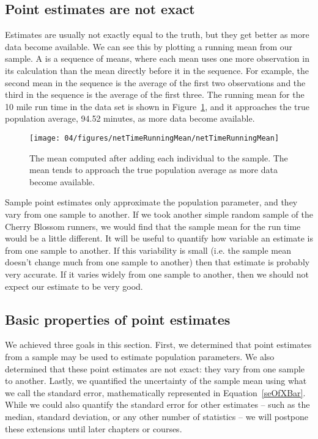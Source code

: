 \subsection{Point estimates are not exact}

Estimates are usually not exactly equal to the truth, but they get better as more data become available. We can see this by plotting a running mean from our  sample. A  is a sequence of means, where each mean uses one more observation in its calculation than the mean directly before it in the sequence. For example, the second mean in the sequence is the average of the first two observations and the third in the sequence is the average of the first three. The running mean for the 10 mile run time in the  data set is shown in Figure~\ref{netTimeRunningMean}, and it approaches the true population average, 94.52 minutes, as more data become available.

\begin{figure}
   \centering
   \texttt{[image: 04/figures/netTimeRunningMean/netTimeRunningMean]}
   \caption{The mean computed after adding each individual to the sample. The mean tends to approach the true population average as more data become available.}
   \label{netTimeRunningMean}
\end{figure}

Sample point estimates only approximate the population parameter, and they vary from one sample to another. If we took another simple random sample of the Cherry Blossom runners, we would find that the sample mean for the run time would be a little different. It will be useful to quantify how variable
an estimate is from one sample to another. If this variability is small (i.e. the sample mean doesn't change much from one sample to another) then that estimate is probably very accurate. If it varies widely from one sample to another, then we should not expect our estimate to be very good.


\subsection{Basic properties of point estimates}

We achieved three goals in this section. First, we determined that point estimates from a sample may be used to estimate population parameters. We also determined that these point estimates are not exact: they vary from one sample to another. Lastly, we quantified the uncertainty of the sample mean using what we call the standard error, mathematically represented in Equation~\eqref{seOfXBar}. While we could also quantify the standard error for other estimates -- such as the median, standard deviation, or any other number of statistics -- we will postpone these extensions until later chapters or courses.

